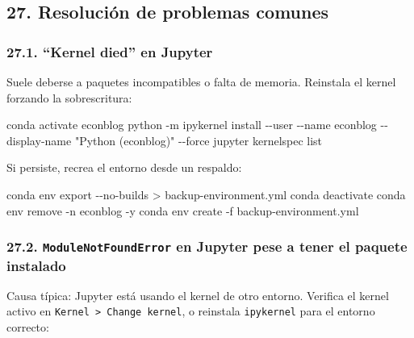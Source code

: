 \documentclass[
  doc,
  floatsintext,
  longtable,
  a4paper,
  nolmodern,
  notxfonts,
  notimes,
  12pt,
  colorlinks=true,linkcolor=blue,citecolor=blue,urlcolor=blue]{apa7}
\newenvironment{Shaded}{\begin{snugshade}}{\end{snugshade}}
\newcommand{\AttributeTok}[1]{\textcolor[rgb]{0.40,0.45,0.13}{#1}}
\newcommand{\ExtensionTok}[1]{\textcolor[rgb]{0.00,0.23,0.31}{#1}}
\newcommand{\NormalTok}[1]{\textcolor[rgb]{0.00,0.23,0.31}{#1}}
\newcommand{\OperatorTok}[1]{\textcolor[rgb]{0.37,0.37,0.37}{#1}}
\newcommand{\StringTok}[1]{\textcolor[rgb]{0.13,0.47,0.30}{#1}}
\begin{document}
\subsection{27. Resolución de problemas
comunes}\label{resoluciuxf3n-de-problemas-comunes}

\subsubsection{27.1. ``Kernel died'' en
Jupyter}\label{kernel-died-en-jupyter}

Suele deberse a paquetes incompatibles o falta de memoria. Reinstala el
kernel forzando la sobrescritura:

\begin{Shaded}
\begin{Highlighting}[]
\ExtensionTok{conda}\NormalTok{ activate econblog}
\ExtensionTok{python} \AttributeTok{{-}m}\NormalTok{ ipykernel install }\AttributeTok{{-}{-}user} \AttributeTok{{-}{-}name}\NormalTok{ econblog }\AttributeTok{{-}{-}display{-}name} \StringTok{"Python (econblog)"} \AttributeTok{{-}{-}force}
\ExtensionTok{jupyter}\NormalTok{ kernelspec list}
\end{Highlighting}
\end{Shaded}

Si persiste, recrea el entorno desde un respaldo:

\begin{Shaded}
\begin{Highlighting}[]
\ExtensionTok{conda}\NormalTok{ env export }\AttributeTok{{-}{-}no{-}builds} \OperatorTok{\textgreater{}}\NormalTok{ backup{-}environment.yml}
\ExtensionTok{conda}\NormalTok{ deactivate}
\ExtensionTok{conda}\NormalTok{ env remove }\AttributeTok{{-}n}\NormalTok{ econblog }\AttributeTok{{-}y}
\ExtensionTok{conda}\NormalTok{ env create }\AttributeTok{{-}f}\NormalTok{ backup{-}environment.yml}
\end{Highlighting}
\end{Shaded}

\subsubsection{\texorpdfstring{27.2. \texttt{ModuleNotFoundError} en
Jupyter pese a tener el paquete
instalado}{27.2. ModuleNotFoundError en Jupyter pese a tener el paquete instalado}}\label{modulenotfounderror-en-jupyter-pese-a-tener-el-paquete-instalado}

Causa típica: Jupyter está usando el kernel de otro entorno. Verifica el
kernel activo en \texttt{Kernel\ \textgreater{}\ Change\ kernel}, o
reinstala \texttt{ipykernel} para el entorno correcto:
\end{document}
